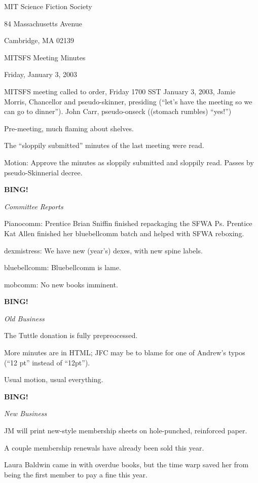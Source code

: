 \documentclass[12pt]{article}
\newcommand{\bing}{{\bf BING!} }
\newcommand{\goto}[1]{\bing \vskip 12pt \centerline{{\em{#1}}}}
\begin{document}
\begin{center}

MIT Science Fiction Society 

84 Massachusetts Avenue

Cambridge, MA 02139

\vspace{12pt}

MITSFS Meeting Minutes 

Friday, January 3, 2003

\end{center}
 
\vspace{18pt}

\setlength{\parskip}{6pt}

\noindent
MITSFS meeting called to order, Friday 1700 SST January 3, 2003,
Jamie Morris, Chancellor and pseudo-skinner, presiding
(``let's have the meeting so we can go to dinner'').
John Carr, pseudo-onseck ((stomach rumbles) ``yes!'')

Pre-meeting, much flaming about shelves.

The ``sloppily submitted'' minutes of the last meeting were read.

Motion: Approve the minutes as sloppily submitted and sloppily read.
Passes by pseudo-Skinnerial decree.

\goto{Committee Reports}

Pianocomm:
Prentice Brian Sniffin finished repackaging the SFWA Ps.
Prentice Kat Allen finished her bluebellcomm batch and helped with
SFWA reboxing.

dexmistress:
We have new (year's) dexes, with new spine labels.

bluebellcomm: Bluebellcomm is lame.

mobcomm:
No new books imminent.

\goto{Old Business}

The Tuttle donation is fully prepreocessed.

More minutes are in HTML; JFC may be to blame for one of Andrew's
typos (``12 pt'' instead of ``12pt'').

Usual motion, usual everything.

\goto{New Business}

JM will print new-style membership sheets on hole-punched, reinforced paper.

A couple membership renewals have already been sold this year.

Laura Baldwin came in with overdue books, but the time warp saved her from
being the first member to pay a fine this year.
\end{document}
